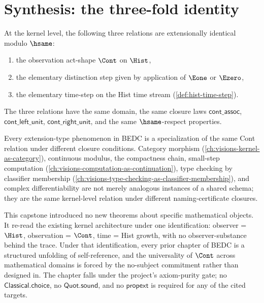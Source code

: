 \section{Synthesis: the three-fold identity}
\label{sec:observer-synthesis-threefold-identity}

\begin{theorem}
\label{thm:observer-distinction-time-identity}
At the kernel level, the following three relations are extensionally identical modulo \(\hsame\):
\begin{enumerate}
  \item the observation act-shape \(\Cont\) on \(\Hist\),
  \item the elementary distinction step given by application of \(\Eone\) or \(\Ezero\),
  \item the elementary time-step on the Hist time stream (\autoref{def:hist-time-step}).
\end{enumerate}
The three relations have the same domain, the same closure laws \(\mathsf{cont\_assoc}\), \(\mathsf{cont\_left\_unit}\), \(\mathsf{cont\_right\_unit}\), and the same \(\hsame\)-respect properties.
\end{theorem}
\begin{corollary}
\label{cor:cont-universal-verb}
Every extension-type phenomenon in BEDC is a specialization of the same Cont relation under different closure conditions. Category morphism (\autoref{ch:visions-kernel-as-category}), continuous modulus, the compactness chain, small-step computation (\autoref{ch:visions-computation-as-continuation}), type checking by classifier membership (\autoref{ch:visions-type-checking-as-classifier-membership}), and complex differentiability are not merely analogous instances of a shared schema; they are the same kernel-level relation under different naming-certificate closures.
\end{corollary}
\begin{remark}
\label{rem:closing-implicit-metaphysics}
This capstone introduced no new theorems about specific mathematical objects. It re-read the existing kernel architecture under one identification: observer = \(\Hist\), observation = \(\Cont\), time = Hist growth, with no observer-substance behind the trace. Under that identification, every prior chapter of BEDC is a structured unfolding of self-reference, and the universality of \(\Cont\) across mathematical domains is forced by the no-subject commitment rather than designed in. The chapter falls under the project's axiom-purity gate; no \(\mathsf{Classical.choice}\), no \(\mathsf{Quot.sound}\), and no \(\mathsf{propext}\) is required for any of the cited targets.
\end{remark}

